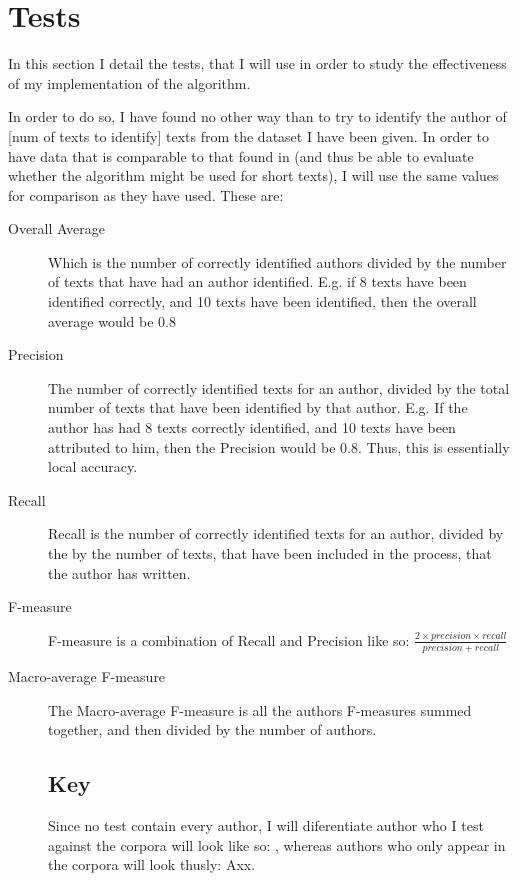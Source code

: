 \section{Tests}
\label{tests}

In this section I detail the tests, that I will use in order to study the effectiveness of my implementation of the algorithm.

In order to do so, I have found no other way than to try to identify the author of [num of texts to identify] texts from the dataset I have been given. In order to have data that is comparable to that found in \cite{nr4} (and thus be able to evaluate whether the algorithm might be used for short texts), I will use the same values for comparison as they have used. These are: 


\begin{description}
\item[Overall Average] Which is the number of correctly identified authors divided by the number of texts that have had an author identified. E.g. if 8 texts have been identified correctly, and 10 texts have been identified, then the overall average would be 0.8 

\item[Precision] The number of correctly identified texts for an author, divided by the total number of texts that have been identified by that author. E.g. If the author has had 8 texts correctly identified, and 10 texts have been attributed to him, then the Precision would be 0.8. Thus, this is essentially local accuracy.

\item[Recall] Recall is the number of correctly identified texts for an author, divided by the by the number of texts, that have been included in the process, that the author has written.

\item[F-measure] F-measure is a combination of Recall and Precision like so: $\frac{2 \times precision \times recall}{precision+recall}$ 

\item[Macro-average F-measure] The Macro-average F-measure is all the authors F-measures summed together, and then divided by the number of authors. 

\subsection{Key}
Since no test contain every author, I will diferentiate author who I test against the corpora will look like so: , whereas authors who only appear in the corpora will look thusly: Axx.


\end{description}
